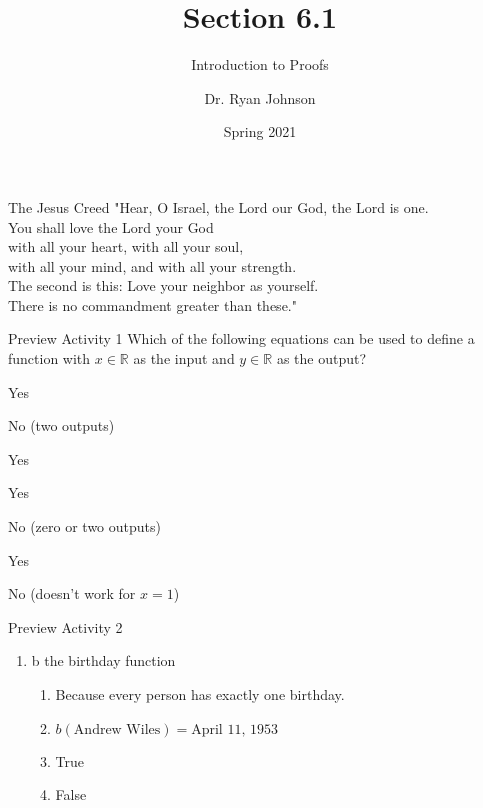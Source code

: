 \documentclass{beamer}
\title{Section 6.1}
\subtitle{Introduction to Proofs}
\author{Dr. Ryan Johnson}
\institute{Grace College}
\date{Spring 2021}
\newcounter{saveenumi}
\newcommand{\seti}{\setcounter{saveenumi}{\value{enumi}}}
\begin{document}
\begin{frame}[plain]
    \maketitle
\end{frame}

\begin{frame}{The Jesus Creed}
\Large{
"Hear, O Israel, the Lord our God, the Lord is one.\\
You shall love the Lord your God\\
\;\; with all your heart, with all your soul,\\
\;\; with all your mind, and with all your strength.\\
The second is this: Love your neighbor as yourself.\\
There is no commandment greater than these."
}
\end{frame}

\begin{frame}[t]{Preview Activity 1}
Which of the following equations can be used to define a function with $x \in \mathbb{R}$
as the input and $y \in \mathbb{R}$ as the output?
    \begin{enumerate}
    \begin{multicols}{2}
        \item Yes
        \item No (two outputs)
        \item Yes
        \item Yes
        \item No (zero or two outputs)
        \item Yes
        \item No (doesn't work for $x=1$)
    \end{multicols}
    \end{enumerate}
\end{frame}

\begin{frame}{Preview Activity 2}
    \begin{enumerate}
        \item b the birthday function
        \begin{enumerate}
            \item Because every person has exactly one birthday.
            \item $b(\text{Andrew Wiles}) = \text{April 11, 1953}$
            \item True
            \item False
        \end{enumerate}
        \seti
    \end{enumerate}
\end{frame}
\end{document}
